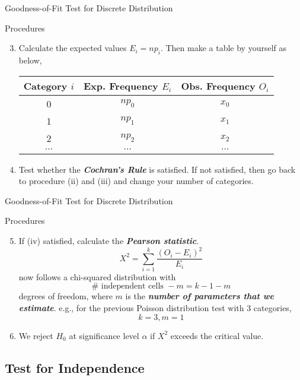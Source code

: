 \documentclass{beamer}
\newcommand{\bb}[1]{\textcolor{antiquefuchsia}{\textbf{\textit{#1}}}}
\begin{document}
\begin{frame}{Goodness-of-Fit Test for Discrete Distribution}
\begin{block}{Procedures}
\begin{enumerate}
\setcounter{enumi}{2}
\item Calculate the expected values $E_{i}=n p_{i}$. Then make a table by yourself as below,
\begin{tabular}{ccc}
\hline Category $i$ & Exp. Frequency $E_{i}$ & Obs. Frequency $O_{i}$ \\
\hline 0 & $n p_{0}$ & $x_{0}$ \\
1 & $n p_{1}$ & $x_{1}$ \\
2 & $n p_{2}$ & $x_{2}$ \\
$\cdots$ & $\cdots$ & $\cdots$ \\
\hline
\end{tabular}
\item Test whether the \bb{Cochran's Rule} is satisfied. If not satisfied, then go back to procedure (ii) and (iii) and change your number of categories.
\end{enumerate}
\end{block}
\end{frame}

\begin{frame}{Goodness-of-Fit Test for Discrete Distribution}
\begin{block}{Procedures}
\begin{enumerate}
\setcounter{enumi}{4}
\item If (iv) satisfied, calculate the \bb{Pearson statistic}.
$$
X^{2}=\sum_{i=1}^{k} \frac{\left(O_{i}-E_{i}\right)^{2}}{E_{i}}
$$
now follows a chi-squared distribution with
$$\#\text{ independent cells }-m=k-1-m$$
degrees of freedom, where $m$ is the \bb{number of parameters that we estimate}. e.g., for the previous Poisson distribution test with 3 categories,
$$
k=3, m=1
$$
\item We reject $H_{0}$ at significance level $\alpha$ if $X^{2}$ exceeds the critical value.
\end{enumerate}
\end{block}
\end{frame}

\subsection{Test for Independence}
\end{document}
